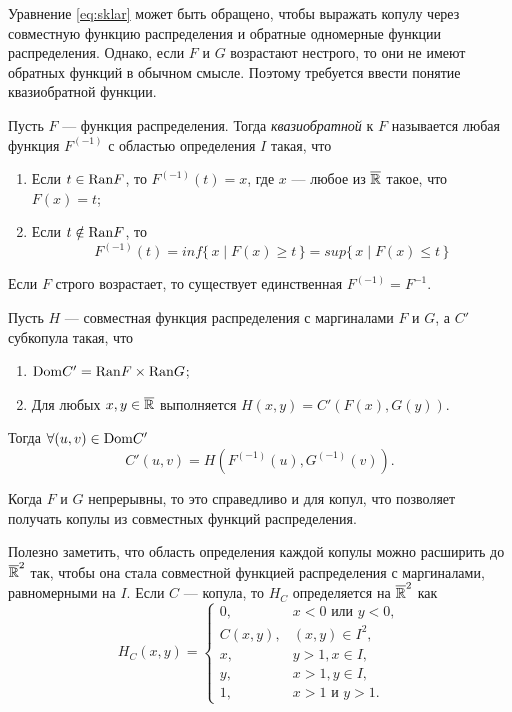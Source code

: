 Уравнение \eqref{eq:sklar} может быть обращено, чтобы выражать копулу через совместную функцию распределения и обратные одномерные функции распределения. Однако, если $F$ и $G$ возрастают нестрого, то они не имеют обратных функций в обычном смысле. Поэтому требуется ввести понятие квазиобратной функции.

\begin{define}
	Пусть $F$ --- функция распределения. Тогда \emph{квазиобратной} к $F$ называется любая функция $F^{(-1)}$ с областью определения $I$ такая, что
	\begin{enumerate}
	\item Если $t \in \mathrm{Ran}{F}$, то $F^{(-1)}(t) = x$, где $x$ --- любое из $\overline{\mathbb{R}}$ такое, что $F(x) = t$;
	\item Если $t \notin \mathrm{Ran}{F}$, то
	\[
	F^{(-1)}(t) = inf \{\, x \mid F(x) \geqslant t \,\} = sup \{\, x \mid F(x) \leqslant t \,\}
	\]
	\end{enumerate}
\end{define}
Если $F$ строго возрастает, то существует единственная $F^{(-1)} = F^{-1}$.

\begin{theorem}
	Пусть $H$ --- совместная функция распределения с маргиналами $F$ и $G$, а $C'$ субкопула такая, что
	\begin{enumerate}
	\item $\mathrm{Dom}{C'} = \mathrm{Ran}{F} \times \mathrm{Ran}{G}$;
	\item Для любых $x, y \in \overline{\mathbb{R}}$ выполняется $H(x, y) = C'(F(x), G(y))$.
	\end{enumerate}
Тогда $\forall (u, v) \in \mathrm{Dom}{C'}$
\[
C'(u, v) = H(F^{(-1)}(u), G^{(-1)}(v)).
\]
\end{theorem}

Когда $F$ и $G$ непрерывны, то это справедливо и для копул, что позволяет получать копулы из совместных функций распределения.

Полезно заметить, что область определения каждой копулы можно расширить до $\overline{\mathbb{R}}^2$ так, чтобы она стала совместной функцией распределения с маргиналами, равномерными на $I$. Если $C$ --- копула, то $H_C$ определяется на $\overline{\mathbb{R}}^2$ как
\[
H_C(x, y) =
\begin{cases}
0, &x < 0 \text{ или } y < 0, \\
C(x, y), &(x, y) \in I^2, \\
x, &y > 1, x \in I, \\
y, &x > 1, y \in I, \\
1, &x > 1 \text{ и } y > 1.
\end{cases}
\]

